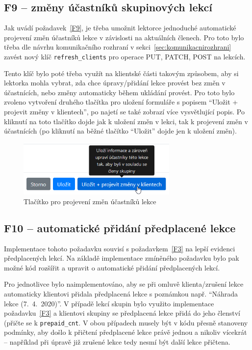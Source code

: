 \subsection{F9 -- změny účastníků skupinových lekcí}

Jak uvádí požadavek~\ref{F9}, je třeba umožnit lektorce jednoduché automatické projevení změn účastníků lekce v závislosti na aktuálních členech. Pro toto bylo třeba dle návrhu komunikačního rozhraní v sekci~\ref{sec:komunikacnirozhrani} zavést nový klíč \verb|refresh_clients| pro operace PUT, PATCH, POST na lekcích.

Tento klíč bylo poté třeba využít na klientské části takovým způsobem, aby si lektorka mohla vybrat, zda chce úpravy/přidání lekce provést bez změn v účastnících, nebo změny automaticky během ukládání provést. Pro toto bylo zvoleno vytvoření druhého tlačítka pro uložení formuláře s popisem \enquote{Uložit + projevit změny v klientech}, po najetí se také zobrazí více vysvětlující popis. Po kliknutí na toto tlačítko dojde jak k uložení změn v lekci, tak k projevení změn v účastnících (po kliknutí na běžné tlačítko \enquote{Uložit} dojde jen k uložení změn).

\begin{figure}[h]\centering
    \includegraphics[width=0.7\textwidth]{img/ui-screen-formular-projevenizmen.png}
    \caption{Tlačítko pro projevení změn účastníků lekce}\label{fig:ui-screen-formular-projevenizmen}
\end{figure}

\subsection{F10 -- automatické přidání předplacené lekce}

Implementace tohoto požadavku souvisí s požadavkem~\ref{F3} na lepší evidenci předplacených lekcí. Na základě implementace zmíněného požadavku bylo pak možné kód rozšířit a upravit o automatické přidání předplacených lekcí.

Pro jednotlivce bylo naimplementováno, aby se při omluvě klienta/zrušení lekce automaticky klientovi přidala předplacená lekce s poznámkou např. \enquote{Náhrada lekce (7.~4.~2020)}. V případě lekcí skupin bylo využito implementace požadavku~\ref{F3} a klientovi skupiny se předplacená lekce přidá do jeho členství (přičte se k \verb|prepaid_cnt|. V obou případech musely být v kódu přesně stanoveny podmínky, aby došlo k přičtení předplacené lekce právě jednou a nikoliv vícekrát -- například při úpravě již zrušené lekce tedy nesmí být další lekce přičtena.

